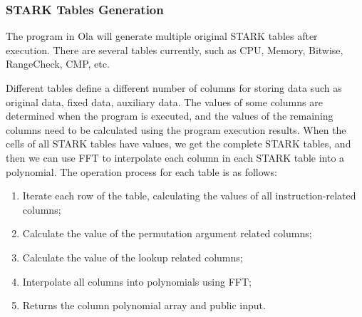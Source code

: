 \subsubsection{STARK Tables Generation}\label{section: starky-generation-tables}

The program in Ola will generate multiple original STARK tables after execution. There are several tables currently, such as CPU, Memory, Bitwise, RangeCheck, CMP, etc.

Different tables define a different number of columns for storing data such as original data, fixed data, auxiliary data. The values of some columns are determined when the program is executed, and the values of the remaining columns need to be calculated using the program execution results. When the cells of all STARK tables have values, we get the complete STARK tables, and then we can use FFT to interpolate each column in each STARK table into a polynomial. The operation process for each table is as follows:

\begin{enumerate}
    \item Iterate each row of the table, calculating the values of all instruction-related columns;
    \item Calculate the value of the permutation argument related columns;
    \item Calculate the value of the lookup related columns;
    \item Interpolate all columns into polynomials using FFT;
    \item Returns the column polynomial array and public input.
\end{enumerate}
